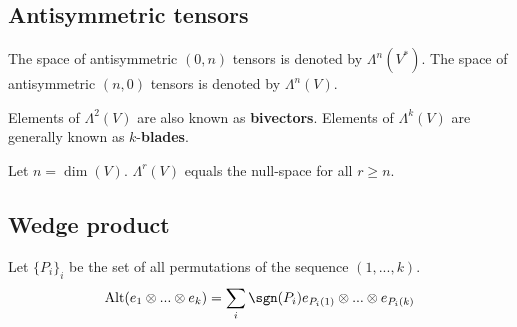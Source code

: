\subsection{Antisymmetric tensors}

	\begin{notation}\label{tensor:not:antysimmetric_space}
		The space of antisymmetric $(0,n)$ tensors is denoted by $\Lambda^n(V^*)$. The space of antisymmetric $(n, 0)$ tensors is denoted by $\Lambda^n(V)$.
	\end{notation}

	\begin{remark*}
    		Elements of $\Lambda^2(V)$ are also known as \textbf{bivectors}. Elements of $\Lambda^k(V)$ are generally known as $k$-\textbf{blades}.
	\end{remark*}
    
	\begin{property}
    		Let $n = \dim(V)$. $\Lambda^r(V)$ equals the null-space for all $r\geq n$.
	\end{property}
    
\subsection{Wedge product}

	\begin{formula}[Antisymmetrization]
		Let $\{P_i\}_i$ be the set of all permutations of the sequence $(1, ..., k)$.
		\begin{equation}
			\label{tensors:antisymmetrization}
			\text{Alt}(e_1\otimes...\otimes e_k) = \sum_i \sgn(P_i)e_{P_i(1)}\otimes...\otimes e_{P_i(k)}
		\end{equation}
	\end{formula}

    
